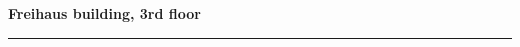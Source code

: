 \documentclass[a4paper]{article}
\begin{document}
\begin{center}
	{\Large\bf Freihaus building, 3rd floor}
	\\[5mm]
	\rule{220mm}{1pt}
	\\[10mm]
\end{center}

\begin{center}
\hspace*{-30pt}

\end{center}
\end{document}
